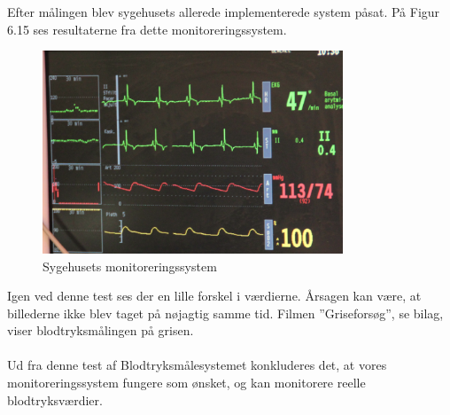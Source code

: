 Efter målingen blev sygehusets allerede implementerede system påsat. På Figur 6.15 ses resultaterne fra dette monitoreringssystem. 

\begin{figure}[H]
	\centering
	\includegraphics[width=0.8\textwidth]{Figurer/Snip20151214_102}
	\caption{Sygehusets monitoreringssystem}
\end{figure}


Igen ved denne test ses der en lille forskel i værdierne. Årsagen kan være, at billederne ikke blev taget på nøjagtig samme tid. Filmen ”Griseforsøg”, se bilag, viser blodtryksmålingen på grisen.
\\\\ 
Ud fra denne test af Blodtryksmålesystemet konkluderes det, at vores monitoreringssystem fungere som ønsket, og kan monitorere reelle blodtryksværdier. 


